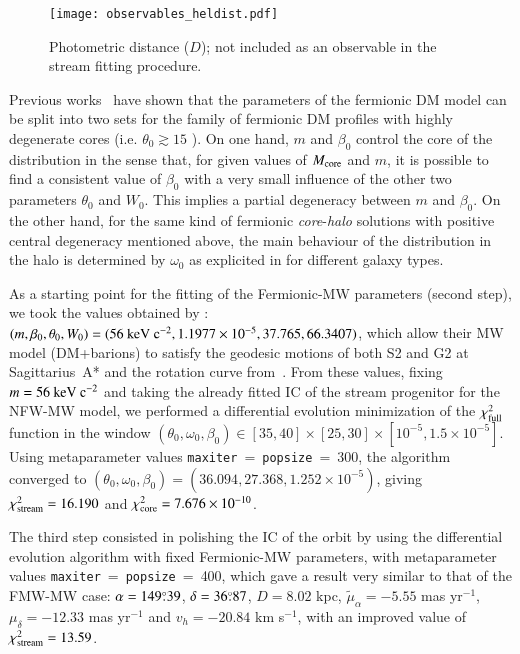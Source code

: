 \documentclass[twocolumn]{aa}
\begin{document}
\begin{figure}
   \texttt{[image: observables\_heldist.pdf]}
   \caption{Photometric distance ($D$); not included as an observable in the stream fitting procedure.}
   \label{fig:obs_radial}
\end{figure}
Previous works~\citep{arguelles_novel_2018,2019PDU....24..278A,2023ApJ...945....1K} have shown that the parameters of the fermionic DM model can be split into two sets for the family of fermionic DM profiles with highly degenerate cores (i.e. $\theta_0 \gtrsim 15$ \citealp{2019PDU....24..278A}). On one hand, $m$ and $\beta_0$ control the core of the distribution in the sense that, for given values of $M_{\rm{core}}$ and $m$, it is possible to find a consistent value of $\beta_0$ with a very small influence of the other two parameters $\theta_0$ and $W_0$. This implies a partial degeneracy between $m$ and $\beta_0$.
On the other hand, for the same kind of fermionic \textit{core}-\textit{halo} solutions with positive central degeneracy mentioned above, the main behaviour of the distribution in the halo is determined by $\omega_0$ as explicited in \cite{2019PDU....24..278A} for different galaxy types.


As a starting point for the fitting of the Fermionic-MW parameters (second step), we took the values obtained by \citet{2020A&A...641A..34B}: $(m, \beta_0, \theta_0, W_0)=(56~\rm{keV}~c^{-2}, 1.1977\times10^{-5}, 37.765, 66.3407)$, which allow their MW model (DM+barions) to satisfy the geodesic motions of both S2 and G2 at Sagittarius~A* and the rotation curve from~\citet{sofue_rotation_2013}.
From these values, fixing $m=56~\rm{keV}~c^{-2}$ and taking the already fitted IC of the stream progenitor for the NFW-MW model, we performed a differential evolution minimization of the
$\chi^2_{\rm{full}}$ function in the window
$(\theta_0,\omega_0, \beta_0)\in [35, 40]\times[25, 30]\times[10^{-5}, 1.5\times10^{-5}]$. Using metaparameter values \texttt{maxiter}$~=~$\texttt{popsize}$~=~$300, the algorithm converged to
$(\theta_0, \omega_0, \beta_0)= (36.094, 27.368 , 1.252\times10^{-5})$, giving
$\chi^2_{\rm{stream}}= 16.190$ and  $\chi^2_{\rm{core}}= 7.676\times10^{-10}$.

The third step consisted in polishing the IC of the orbit by using the differential evolution algorithm with fixed Fermionic-MW parameters, with metaparameter values \texttt{maxiter}$~=~$\texttt{popsize}$~=~$400, which gave a result very similar to that of the FMW-MW case:
$\alpha=149\overset{\circ}{.} 39$, $\delta=36\overset{\circ}{.} 87$, $D=8.02$ kpc,
$\tilde{\mu}_\alpha=-5.55$ mas yr$^{-1}$, $\mu_\delta=-12.33$ mas yr$^{-1}$ and $v_h=-20.84$ km s$^{-1}$, with an improved value of $\chi^2_{\rm{stream}}= 13.59$.
\end{document}
